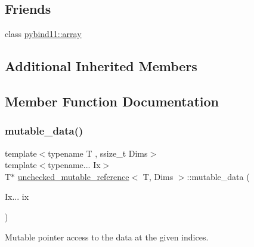 \subsection*{Friends}
\begin{DoxyCompactItemize}
\item 
class \mbox{\hyperlink{classunchecked__mutable__reference_abcb10178a21ebe8e899ca951b2e68608}{pybind11\+::array}}
\end{DoxyCompactItemize}
\subsection*{Additional Inherited Members}


\subsection{Member Function Documentation}
\mbox{\label{classunchecked__mutable__reference_a7af40f1be08cf6c15f37a52c129ca9ff}} 
\subsubsection{\texorpdfstring{mutable\_data()}{mutable\_data()}}
{\footnotesize\ttfamily template$<$typename T , ssize\+\_\+t Dims$>$ \\
template$<$typename... Ix$>$ \\
T$\ast$ \mbox{\hyperlink{classunchecked__mutable__reference}{unchecked\+\_\+mutable\+\_\+reference}}$<$ T, Dims $>$\+::mutable\+\_\+data (\begin{DoxyParamCaption}\item[{Ix...}]{ix }\end{DoxyParamCaption})\hspace{0.3cm}{\ttfamily [inline]}}



Mutable pointer access to the data at the given indices. 

\mbox{\label{classunchecked__mutable__reference_a1dc6e7e35c5957b7ab3dbcca9fa7e60a}} 
